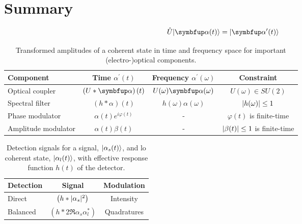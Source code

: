 \section*{Summary}

\begin{equation}
	\hat{U}
	\ket{\vb{\alpha}(t)}
	=
	\ket{\vb{\alpha}^\prime(t)}
\end{equation}

\begin{table}[htb]
	\centering	
	\begin{tabular}{lccc}
		\toprule
			Component & Time $\alpha^\prime(t)$ & Frequency $\alpha^\prime(\omega)$ & Constraint \\
		\midrule
			Optical coupler & $\left(U*\vb{\alpha}\right)(t)$ & $U(\omega)\vb{\alpha}(\omega)$ & $U(\omega)\in SU(2)$ \\
			Spectral filter & $\left(h*\alpha\right)(t)$ & $h(\omega)\alpha(\omega)$ & $\lvert h(\omega)\rvert\leq1$ \\
			Phase modulator & $\alpha(t)e^{i\varphi(t)}$ & - & $\varphi(t)$ is finite-time \\
			Amplitude modulator & $\alpha(t)\beta(t)$ & - & $\lvert\beta(t)\rvert\leq1$ is finite-time \\
		\bottomrule
	\end{tabular}
	\caption{Transformed amplitudes of a coherent state in time and frequency space for important (electro-)optical components.}
\end{table}

\begin{table}[htb]
	\centering	
	\begin{tabular}{lcc}
		\toprule
			Detection & Signal & Modulation \\
		\midrule
			Direct & $\left(h*\lvert\alpha_s\rvert^2\right)$ & Intensity \\
			Balanced & $\left(h*2\Re{\alpha_s\alpha_l^*}\right)$ & Quadratures \\
		\bottomrule
	\end{tabular}
	\caption{Detection signals for a signal, $\lvert\alpha_s(t)\rangle$, and \gls{lo} coherent state, $\lvert\alpha_l(t)\rangle$, with effective response function $h(t)$ of the detector.}
\end{table}